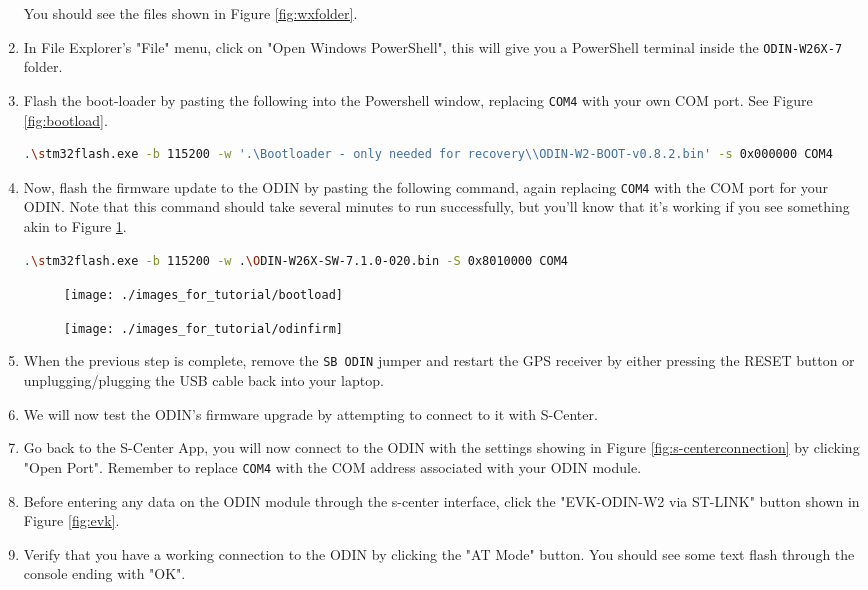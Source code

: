 \documentclass{article}%
\begin{document}
\begin{enumerate}
		You should see the files shown in Figure \ref{fig:wxfolder}.
	\item In File Explorer's "File" menu, click on "Open Windows PowerShell", this will give you a PowerShell terminal inside the \texttt{ODIN-W26X-7} folder.
	\item Flash the boot-loader by pasting the following into the Powershell window, replacing \texttt{COM4} with your own COM port. See Figure \ref{fig:bootload}.
	\begin{lstlisting}[language=bash]
		.\stm32flash.exe -b 115200 -w '.\Bootloader - only needed for recovery\\ODIN-W2-BOOT-v0.8.2.bin' -s 0x000000 COM4
	\end{lstlisting}
	
	\item Now, flash the firmware update to the ODIN by pasting the following command, again replacing \texttt{COM4} with the COM port for your ODIN.  Note that this command should take several minutes to run successfully, but you'll know that it's working if you see something akin to Figure \ref{fig:odinfirm}.

	\begin{lstlisting}[language=bash]
		.\stm32flash.exe -b 115200 -w .\ODIN-W26X-SW-7.1.0-020.bin -S 0x8010000 COM4
	\end{lstlisting}
	
	\begin{figure}
	\centering
	\begin{minipage}{.5\textwidth}
	  \centering
	  \texttt{[image: ./images\_for\_tutorial/bootload]}
	  \label{fig:bootload}
	\end{minipage}%
	\begin{minipage}{.5\textwidth}
	  \centering
	  \texttt{[image: ./images\_for\_tutorial/odinfirm]}
	  \label{fig:odinfirm}
	\end{minipage}
	\end{figure}
	
	\item When the previous step is complete, remove the \texttt{SB ODIN} jumper and restart the GPS receiver by either pressing the RESET button or unplugging/plugging the USB cable back into your laptop.
	\item We will now test the ODIN's firmware upgrade by attempting to connect to it with S-Center.
	\item Go back to the S-Center App, you will now connect to the ODIN with the settings showing in Figure \ref{fig:s-centerconnection} by clicking "Open Port".  Remember to replace \texttt{COM4} with the COM address associated with your ODIN module.
	\item Before entering any data on the ODIN module through the s-center interface, click the "EVK-ODIN-W2 via ST-LINK" button shown in Figure \ref{fig:evk}.
	\item Verify that you have a working connection to the ODIN by clicking the "AT Mode" button.  You should see some text flash through the console ending with "OK".


\end{enumerate}
\end{document}
